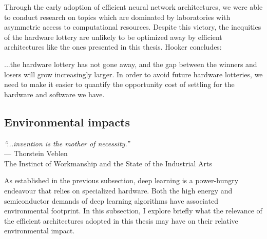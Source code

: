 Through the early adoption of efficient neural network architectures, we were able to conduct research on topics which are dominated by laboratories with asymmetric access to computational resources. Despite this victory, the inequities of the hardware lottery are unlikely to be optimized away by efficient architectures like the ones presented in this thesis. Hooker concludes:

\begin{displayquote}
\begin{singlespace}
...the hardware lottery has not gone away, and the gap between the winners and losers will grow increasingly larger. In order to avoid future hardware lotteries, we need to make it easier to quantify the opportunity cost of settling for the hardware and software we have. \cite{hardware_lottery}
\end{singlespace}
\end{displayquote}

\subsection*{Environmental impacts}

\begin{displayquote}
\begin{singlespace}
\textit{``...invention is the mother of necessity.''}
\\\hspace*{6mm}--- Thorstein Veblen\\\hspace*{11mm}The Instinct of Workmanship and the State of the Industrial Arts
\end{singlespace}
\end{displayquote}



As established in the previous subsection, deep learning is a power-hungry endeavour that relies on specialized hardware. Both the high energy and semiconductor demands of deep learning algorithms have associated environmental footprint. In this subsection, I explore briefly what the relevance of the efficient architectures adopted in this thesis may have on their relative environmental impact.

